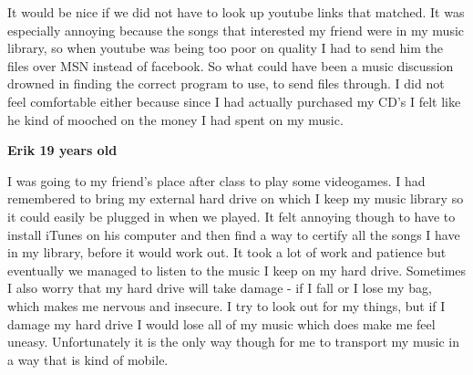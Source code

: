 It would be nice if we did not have to look up youtube links that matched. It was especially annoying because the songs that interested my friend were in my music library, so when youtube was being too poor on quality I had to send him the files over MSN instead of facebook. So what could have been a music discussion drowned in finding the correct program to use, to send files through. I did not feel comfortable either because since I had actually purchased my CD's I felt like he kind of mooched on the money I had spent on my music.

\vspace{5 mm}
\noindent
\textbf{Erik 19 years old}

\vspace{5 mm}
\noindent
I was going to my friend's place after class to play some videogames. I had remembered to bring my external hard drive on which I keep my music library so it could easily be plugged in when we played. It felt annoying though to have to install iTunes on his computer and then find a way to certify all the songs I have in my library, before it would work out. It took a lot of work and patience but eventually we managed to listen to the music I keep on my hard drive. Sometimes I also worry that my hard drive will take damage - if I fall or I lose my bag, which makes me nervous and insecure. I try to look out for my things, but if I damage my hard drive I would lose all of my music which does make me feel uneasy. Unfortunately it is the only way though for me to transport my music in a way that is kind of mobile.